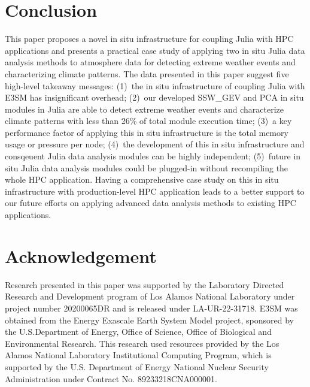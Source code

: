 \documentclass{juliacon}
\begin{document}
\section{Conclusion}



This paper proposes a novel in situ infrastructure for coupling Julia with HPC applications and presents a practical case study of applying two in situ Julia data analysis methods to atmosphere data for detecting extreme weather events and characterizing climate patterns. The data presented in this paper suggest five high-level takeaway messages: (1)~the in situ infrastructure of coupling Julia with E3SM has insignificant overhead; (2)~our developed SSW\_GEV and PCA in situ modules in Julia are able to detect extreme weather events and characterize climate patterns with less than 26\% of total module execution time; (3)~a key performance factor of applying this in situ infrastructure is the total memory usage or pressure per node; (4)~the development of this in situ infrastructure and consqeuent Julia data analysis modules can be highly independent; (5)~future in situ Julia data analysis modules could be plugged-in without recompiling the whole HPC application. Having a comprehensive case study on this in situ infrastructure with production-level HPC application leads to a better support to our future efforts on applying advanced data analysis methods to existing HPC applications.


\section*{Acknowledgement}


Research presented in this paper was supported by the Laboratory
Directed Research and Development program of Los Alamos National
Laboratory under project number 20200065DR and is released
under LA-UR-22-31718. E3SM was obtained from the Energy Exascale
Earth System Model project, sponsored by the U.S.Department
of Energy, Office of Science, Office of Biological and Environmental
Research. This research used resources provided by the Los Alamos
National Laboratory Institutional Computing Program, which is
supported by the U.S. Department of Energy National Nuclear Security
Administration under Contract No. 89233218CNA000001.



\end{document}
